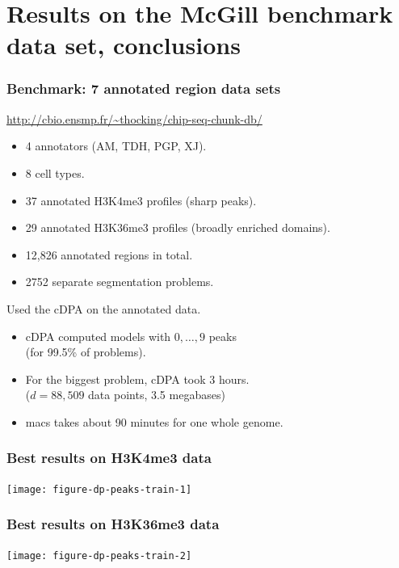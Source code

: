 \documentclass{beamer}
\begin{document}
\section{Results on the McGill benchmark data set, conclusions}

\begin{frame}
  \frametitle{Benchmark: 7 annotated region data sets}
  \url{http://cbio.ensmp.fr/~thocking/chip-seq-chunk-db/}
  \begin{itemize}
  \item 4 annotators (AM, TDH, PGP, XJ).
  \item 8 cell types.
  \item 37 annotated H3K4me3 profiles (sharp peaks).
  \item 29 annotated H3K36me3 profiles (broadly enriched domains).
  \item 12,826 annotated regions in total.
  \item 2752 separate segmentation problems.
  \end{itemize}
  Used the cDPA on the annotated data.
  \begin{itemize}
  \item cDPA computed models with $0, \dots, 9$ peaks\\
    (for 99.5\% of problems).
  \item For the biggest problem, cDPA took 3 hours.\\
    ($d=88,509$ data points, 3.5 megabases)
  \item macs takes about 90 minutes for one whole genome.
  \end{itemize}
\end{frame}

\begin{frame}
  \frametitle{Best results on H3K4me3 data}
  \texttt{[image: figure-dp-peaks-train-1]}
\end{frame}

\begin{frame}
  \frametitle{Best results on H3K36me3 data}
  \texttt{[image: figure-dp-peaks-train-2]}
\end{frame}
\end{document}
